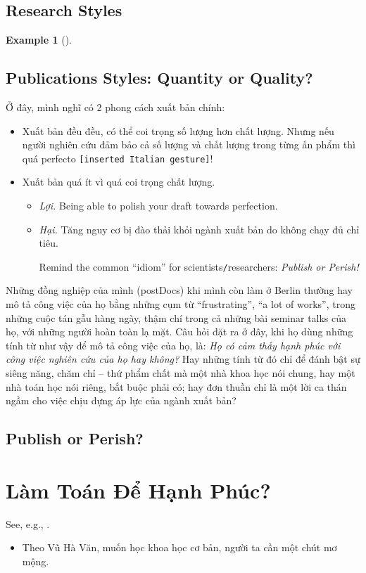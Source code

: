 \documentclass{article}
\numberwithin{equation}{section}
\newtheorem{example}{Example}[section]
\begin{document}
\subsection{Research Styles}
\begin{example}[\cite{VNE/PHH}]
	
\end{example}

\subsection{Publications Styles: Quantity or Quality?}
Ở đây, mình nghĩ có 2 phong cách xuất bản chính:
\begin{itemize}
	\item Xuất bản đều đều, có thể coi trọng số lượng hơn chất lượng. Nhưng nếu người nghiên cứu đảm bảo cả số lượng và chất lượng trong từng ấn phẩm thì quá perfecto \texttt{[inserted Italian gesture]}!
	\item Xuất bản quá ít vì quá coi trọng chất lượng.
	\begin{itemize}
		\item \textit{Lợi.} Being able to polish your draft towards perfection.
		\item \textit{Hại.} Tăng nguy cơ bị đào thải khỏi ngành xuất bản do không chạy đủ chỉ tiêu.
		
		Remind the common ``idiom'' for scientists\texttt{/}researchers: \textit{Publish or Perish!}
	\end{itemize}
\end{itemize}
Những đồng nghiệp của mình (postDocs) khi mình còn làm ở Berlin thường hay mô tả công việc của họ bằng những cụm từ ``frustrating'', ``a lot of works'', trong những cuộc tán gẫu hàng ngày, thậm chí trong cả những bài seminar talks của họ, với những người hoàn toàn lạ mặt. Câu hỏi đặt ra ở đây, khi họ dùng những tính từ như vậy để mô tả công việc của họ, là: \textit{Họ có cảm thấy hạnh phúc với công việc nghiên cứu của họ hay không?} Hay những tính từ đó chỉ để đánh bật sự siêng năng, chăm chỉ -- thứ phẩm chất mà một nhà khoa học nói chung, hay một nhà toán học nói riêng, bắt buộc phải có; hay đơn thuần chỉ là một lời ca thán ngầm cho việc chịu đựng áp lực của ngành xuất bản?

\subsection{Publish or Perish?}

\section{Làm Toán Để Hạnh Phúc?}
See, e.g., \cite{TN/VHV}.
\begin{itemize}
	\item Theo Vũ Hà Văn, muốn học khoa học cơ bản, người ta cần một chút mơ mộng.
\end{itemize}
\end{document}
